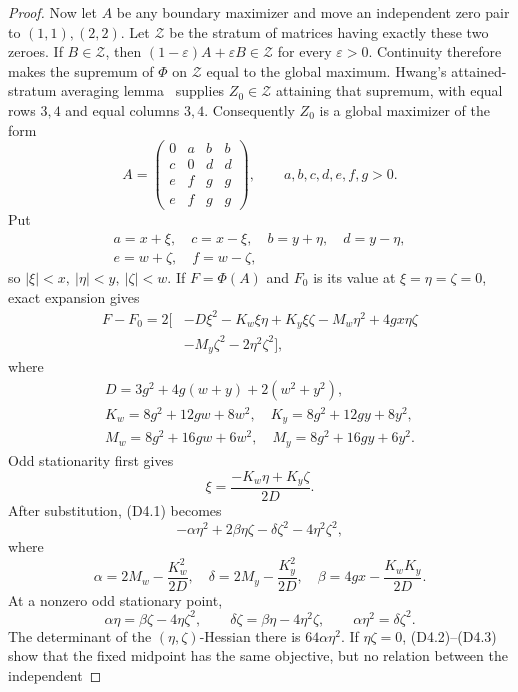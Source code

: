 \documentclass[10pt,a4paper]{amsart}
\theoremstyle{definition}
\theoremstyle{remark}
\begin{document}
\begin{proof}
Now let \(A\) be any boundary maximizer and move an independent zero pair
to \((1,1),(2,2)\).  Let \(\mathcal Z\) be the stratum of matrices having
exactly these two zeroes.  If \(B\in\mathcal Z\), then
\((1-\varepsilon)A+\varepsilon B\in\mathcal Z\) for every
\(\varepsilon>0\).  Continuity therefore makes the supremum of \(\Phi\) on
\(\mathcal Z\) equal to the global maximum.  Hwang's attained-stratum
averaging lemma~\cite[Lemma 3.4]{CW} supplies \(Z_0\in\mathcal Z\) attaining
that supremum, with equal rows \(3,4\) and equal columns \(3,4\).
Consequently \(Z_0\) is a global maximizer of the form
\[
 A=\begin{pmatrix}
 0&a&b&b\\ c&0&d&d\\ e&f&g&g\\ e&f&g&g
 \end{pmatrix},\qquad a,b,c,d,e,f,g>0.
\]
Put
\[
\begin{gathered}
a=x+\xi,\quad c=x-\xi,\quad b=y+\eta,\quad d=y-\eta,\\
e=w+\zeta,\quad f=w-\zeta,
\end{gathered}
\]
so \(|\xi|<x,\ |\eta|<y,\ |\zeta|<w\).  If \(F=\Phi(A)\) and \(F_0\)
is its value at \(\xi=\eta=\zeta=0\), exact expansion gives
\[
\begin{split}
F-F_0=2[&-D\xi^2-K_w\xi\eta+K_y\xi\zeta-M_w\eta^2
 +4gx\eta\zeta\\
&-M_y\zeta^2-2\eta^2\zeta^2],
\end{split}                                                    \tag{D4.1}
\]
where
\[
\begin{gathered}
D=3g^2+4g(w+y)+2(w^2+y^2),\\
K_w=8g^2+12gw+8w^2,\quad K_y=8g^2+12gy+8y^2,\\
M_w=8g^2+16gw+6w^2,\quad M_y=8g^2+16gy+6y^2.
\end{gathered}
\]
Odd stationarity first gives
\[
\xi=\frac{-K_w\eta+K_y\zeta}{2D}.
\]
After substitution, (D4.1) becomes
\[
-\alpha\eta^2+2\beta\eta\zeta-\delta\zeta^2
-4\eta^2\zeta^2,                                  \tag{D4.2}
\]
where
\[
\alpha=2M_w-\frac{K_w^2}{2D},\quad
\delta=2M_y-\frac{K_y^2}{2D},\quad
\beta=4gx-\frac{K_wK_y}{2D}.
\]
At a nonzero odd stationary point,
\[
\alpha\eta=\beta\zeta-4\eta\zeta^2,\qquad
\delta\zeta=\beta\eta-4\eta^2\zeta,\qquad
\alpha\eta^2=\delta\zeta^2.                       \tag{D4.3}
\]
The determinant of the \((\eta,\zeta)\)-Hessian there is
\(64\alpha\eta^2\).  If \(\eta\zeta=0\), (D4.2)--(D4.3) show that the fixed
midpoint has the same objective, but no relation between the independent

\end{proof}
\end{document}
